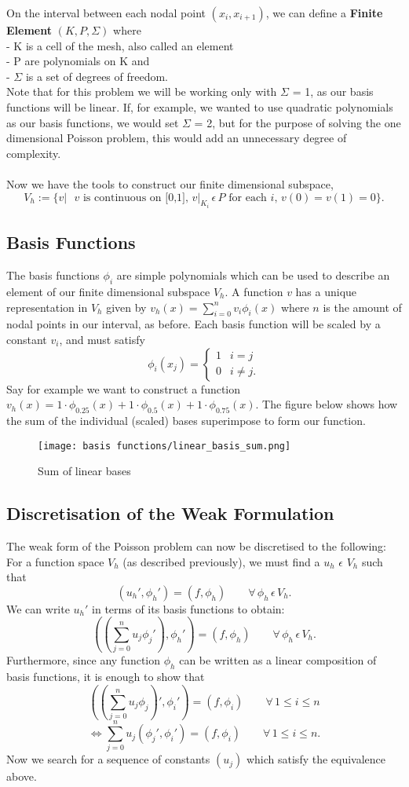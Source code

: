 \documentclass{article}
\begin{document}
On the interval between each nodal point $(x_i, x_{i+1})$, we can define a \textbf{Finite Element} $(K, P, \Sigma)$  where \\
- K is a cell of the mesh, also called an element \\
- P are polynomials on K and \\
- $\Sigma$ is a set of degrees of freedom. \\
Note that for this problem we will be working only with $\Sigma$ = 1, as our basis functions will be linear. If, for example, we wanted to use quadratic polynomials as our basis functions, we would set $\Sigma$ = 2, but for the purpose of solving the one dimensional Poisson problem, this would add an unnecessary degree of complexity. \\
\\
Now we have the tools to construct our finite dimensional subspace,
$$ V_h := \{v| \textrm{ $v$ is continuous on [0,1], } v|_{K_i}\, \epsilon\, P \textrm{ for each } i,\,  v(0) = v(1) = 0 \}. $$

\subsection{Basis Functions}
  The basis functions $\phi_i$ are simple polynomials which can be used to describe an element of our finite dimensional subspace $V_h$. A function $v$ has a unique representation in $V_h$ given by 
 $v_h(x) = \sum_{i=0}^{n}v_i\phi_i(x)$ where $n$ is the amount of nodal points in our interval, as before. Each basis function will be scaled by a constant $v_i$, and must satisfy $$\phi_i(x_j) =  \begin{cases} 
      1 & i = j \\
      0 & i \neq j.
   \end{cases}$$
Say for example we want to construct a function $v_h(x) = 1\cdot \phi_{0.25}(x) + 1\cdot \phi_{0.5}(x) + 1\cdot \phi_{0.75}(x)$. The figure below shows how the sum of the individual (scaled) bases superimpose to form our function. 
\begin{figure}[hbt!]
    \centering
    \texttt{[image: basis functions/linear\_basis\_sum.png]}
    \caption{Sum of linear bases}
    \label{fig:linear basis sum}
\end{figure}
\subsection{Discretisation of the Weak Formulation}
The weak form of the Poisson problem can now be discretised to the following:
For a function space $V_h$ (as described previously), we must find a $u_h$ $\epsilon$ $V_h$ such that 
\[(u_h',\phi_h ') = (f , \phi_h) \qquad\forall\,\phi_h\, \epsilon\, V_h.\]
We can write $u_h'$ in terms of its basis functions to obtain:
\[((\sum_{j=0}^{n}u_j\phi_j'),\phi_h ') = (f , \phi_h) \qquad\forall\,\phi_h\, \epsilon\, V_h.\]
Furthermore, since any function $\phi_h$ can be written as a linear composition of basis functions, it is enough to show that
\[((\sum_{j=0}^{n}u_j\phi_j)',\phi_i ') = (f , \phi_i) \qquad\forall\,1 \leq i \leq n\]
\[\iff \sum_{j=0}^{n}u_j(\phi_j',\phi_i ') = (f , \phi_i) \qquad\forall\,1 \leq i \leq n. \]
Now we search for a sequence of constants $(u_j)$ which satisfy the equivalence above. 
\end{document}
